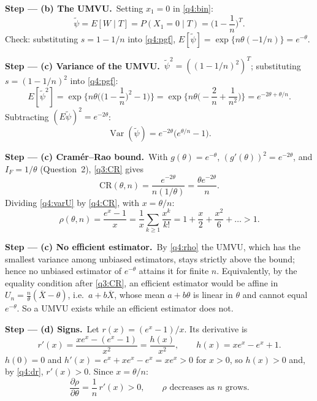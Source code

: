 \documentclass[11pt,a4paper]{article}
\numberwithin{equation}{questao}   %
\newcommand{\passo}[2]{\par\smallskip\noindent\textbf{Step --- #1.}~#2}
\newcommand{\Var}{\operatorname{Var}}
\newcommand{\1}{\mathbf{1}}
\begin{document}
\begin{sol}
\passo{(b) The UMVU}{Setting $x_1=0$ in \eqref{q4:bin}:}
\begin{equation}\label{q4:umvu}
\tilde\psi=E[W\mid T]=P(X_1=0\mid T)=\Big(1-\frac1n\Big)^{T}.
\end{equation}
Check: substituting $s=1-1/n$ into \eqref{q4:pgf}, $E[\tilde\psi]=\exp\{n\theta(-1/n)\}=e^{-\theta}$.

\passo{(c) Variance of the UMVU}{$\tilde\psi^2=((1-1/n)^2)^T$; substituting $s=(1-1/n)^2$ into
\eqref{q4:pgf}:}
\[
E[\tilde\psi^2]=\exp\Big\{n\theta\Big(\Big(1-\frac1n\Big)^2-1\Big)\Big\}=\exp\Big\{n\theta\Big(-\frac2n+\frac1{n^2}\Big)\Big\}=e^{-2\theta+\theta/n}.
\]
Subtracting $(E\tilde\psi)^2=e^{-2\theta}$:
\begin{equation}\label{q4:varU}
\Var(\tilde\psi)=e^{-2\theta}\big(e^{\theta/n}-1\big).
\end{equation}

\passo{(c) Cramér--Rao bound}{With $g(\theta)=e^{-\theta}$, $(g'(\theta))^2=e^{-2\theta}$, and
$I_F=1/\theta$ (Question~2), \eqref{q3:CR} gives}
\begin{equation}\label{q4:CR}
\mathrm{CR}(\theta,n)=\frac{e^{-2\theta}}{n(1/\theta)}=\frac{\theta e^{-2\theta}}{n}.
\end{equation}
Dividing \eqref{q4:varU} by \eqref{q4:CR}, with $x=\theta/n$:
\begin{equation}\label{q4:rho}
\rho(\theta,n)=\frac{e^{x}-1}{x}=\frac{1}{x}\sum_{k\ge1}\frac{x^k}{k!}=1+\frac x2+\frac{x^2}{6}+\dots>1 .
\end{equation}

\passo{(c) No efficient estimator}{By \eqref{q4:rho} the UMVU, which has the smallest variance among
unbiased estimators, stays strictly above the bound; hence no unbiased estimator of $e^{-\theta}$
attains it for finite $n$. Equivalently, by the equality condition after \eqref{q3:CR}, an efficient
estimator would be affine in $U_n=\frac n\theta(\overline X-\theta)$, i.e.\ $a+b\overline X$, whose
mean $a+b\theta$ is linear in $\theta$ and cannot equal $e^{-\theta}$. So a UMVU exists while an
efficient estimator does not.}

\passo{(d) Signs}{Let $r(x)=(e^x-1)/x$. Its derivative is}
\begin{equation}\label{q4:dr}
r'(x)=\frac{xe^x-(e^x-1)}{x^2}=\frac{h(x)}{x^2},\qquad h(x)=xe^x-e^x+1 .
\end{equation}
$h(0)=0$ and $h'(x)=e^x+xe^x-e^x=xe^x>0$ for $x>0$, so $h(x)>0$ and, by \eqref{q4:dr}, $r'(x)>0$.
Since $x=\theta/n$:
\[
\frac{\partial\rho}{\partial\theta}=\frac1n\,r'(x)>0,\qquad \rho\text{ decreases as }n\text{ grows}.
\]


\end{sol}
\end{document}
